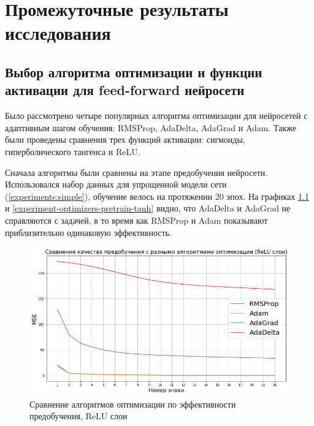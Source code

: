 \documentclass[specification, annotation]{itmo-student-thesis}
\begin{document}
\chapter{Промежуточные результаты исследования}

\section{Выбор алгоритма оптимизации и функции активации для feed-forward нейросети}\label{apx:optimizers}

Было рассмотрено четыре популярных алгоритма оптимизации для нейросетей с адаптивным
шагом обучения: RMSProp\cite{tieleman2012lecture},
AdaDelta\cite{zeiler2012adadelta}, AdaGrad\cite{duchi2011adaptive} и
Adam\cite{kingma2014adam}. Также были проведены сравнения трех функций
активации: сигмоиды, гиперболического тангенса и ReLU.

Сначала алгоритмы были сравнены на этапе предобучения нейросети. Использовался
набор данных для упрощенной модели сети (\ref{experiments:simple}), обучение
велось на протяжении 20 эпох. На графиках
\ref{experiment-optimizers-pretrain-relu} и
\ref{experiment-optimizers-pretrain-tanh} видно, что AdaDelta и AdaGrad не
справляются с задачей, в то время как RMSProp и Adam показывают приблизительно
одинаковую эффективность.

\begin{figure}[!h]
  \caption{Сравнение алгоритмов оптимизации по эффективности
    предобучения, ReLU слои}\label{experiment-optimizers-pretrain-relu}
  \centering
  \includegraphics[scale=0.6]{experiment-optimizers-pretrain-relu}
\end{figure}
\end{document}
